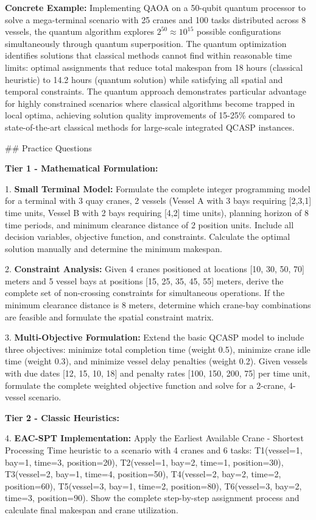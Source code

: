 \documentclass{article}
\begin{document}
\textbf{Concrete Example:} Implementing QAOA on a 50-qubit quantum processor to solve a mega-terminal scenario with 25 cranes and 100 tasks distributed across 8 vessels, the quantum algorithm explores $2^{50} \approx 10^{15}$ possible configurations simultaneously through quantum superposition. The quantum optimization identifies solutions that classical methods cannot find within reasonable time limits: optimal assignments that reduce total makespan from 18 hours (classical heuristic) to 14.2 hours (quantum solution) while satisfying all spatial and temporal constraints. The quantum approach demonstrates particular advantage for highly constrained scenarios where classical algorithms become trapped in local optima, achieving solution quality improvements of 15-25\% compared to state-of-the-art classical methods for large-scale integrated QCASP instances.

## Practice Questions

\textbf{Tier 1 - Mathematical Formulation:}

1. \textbf{Small Terminal Model:} Formulate the complete integer programming model for a terminal with 3 quay cranes, 2 vessels (Vessel A with 3 bays requiring [2,3,1] time units, Vessel B with 2 bays requiring [4,2] time units), planning horizon of 8 time periods, and minimum clearance distance of 2 position units. Include all decision variables, objective function, and constraints. Calculate the optimal solution manually and determine the minimum makespan.

2. \textbf{Constraint Analysis:} Given 4 cranes positioned at locations [10, 30, 50, 70] meters and 5 vessel bays at positions [15, 25, 35, 45, 55] meters, derive the complete set of non-crossing constraints for simultaneous operations. If the minimum clearance distance is 8 meters, determine which crane-bay combinations are feasible and formulate the spatial constraint matrix.

3. \textbf{Multi-Objective Formulation:} Extend the basic QCASP model to include three objectives: minimize total completion time (weight 0.5), minimize crane idle time (weight 0.3), and minimize vessel delay penalties (weight 0.2). Given vessels with due dates [12, 15, 10, 18] and penalty rates [100, 150, 200, 75] per time unit, formulate the complete weighted objective function and solve for a 2-crane, 4-vessel scenario.

\textbf{Tier 2 - Classic Heuristics:}

4. \textbf{EAC-SPT Implementation:} Apply the Earliest Available Crane - Shortest Processing Time heuristic to a scenario with 4 cranes and 6 tasks: T1(vessel=1, bay=1, time=3, position=20), T2(vessel=1, bay=2, time=1, position=30), T3(vessel=2, bay=1, time=4, position=50), T4(vessel=2, bay=2, time=2, position=60), T5(vessel=3, bay=1, time=2, position=80), T6(vessel=3, bay=2, time=3, position=90). Show the complete step-by-step assignment process and calculate final makespan and crane utilization.
\end{document}
